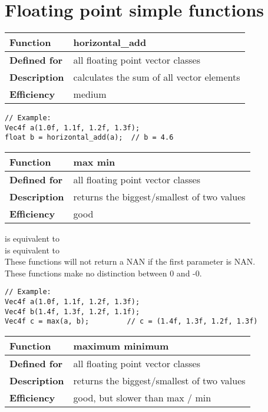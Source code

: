 \documentclass[vcl_manual.tex]{subfiles}
\begin{document}
\section{Floating point simple functions}

\begin{tabular}{|p{25mm}|p{100mm}|}
\hline
\bfseries Function & horizontal\_add \\ \hline
\bfseries Defined for & all floating point vector classes \\ \hline
\bfseries Description & calculates the sum of all vector elements \\ \hline
\bfseries Efficiency & medium \\ \hline
\end{tabular}
\begin{lstlisting}[frame=none]
// Example:
Vec4f a(1.0f, 1.1f, 1.2f, 1.3f);
float b = horizontal_add(a);  // b = 4.6
\end{lstlisting}


\begin{tabular}{|p{25mm}|p{100mm}|}
\hline
\bfseries Function & max \newline min \\ \hline
\bfseries Defined for & all floating point vector classes \\ \hline
\bfseries Description & returns the biggest/smallest of two values \\ \hline
\bfseries Efficiency & good \\ \hline
\end{tabular}

 is equivalent to \\
 is equivalent to \\

These functions will not return a NAN if the first parameter is NAN.\\
These functions make no distinction between 0 and -0.
\begin{lstlisting}[frame=none]
// Example:
Vec4f a(1.0f, 1.1f, 1.2f, 1.3f);
Vec4f b(1.4f, 1.3f, 1.2f, 1.1f);
Vec4f c = max(a, b);         // c = (1.4f, 1.3f, 1.2f, 1.3f)
\end{lstlisting}

\begin{tabular}{|p{25mm}|p{100mm}|}
\hline
\bfseries Function & maximum \newline minimum \\ \hline
\bfseries Defined for & all floating point vector classes \\ \hline
\bfseries Description & returns the biggest/smallest of two values \\ \hline
\bfseries Efficiency & good, but slower than max / min \\ \hline
\end{tabular}
\end{document}
